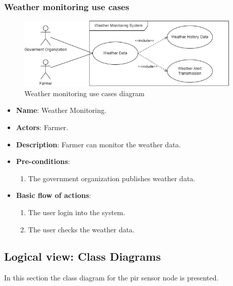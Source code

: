 \subsubsection*{Weather monitoring use cases}
\begin{figure}[H]
    \centering
    \includegraphics[width=0.95\textwidth]{./images/6/weather_uses.png}
    \caption{Weather monitoring use cases diagram}
\end{figure}
\begin{itemize}
    \item \textbf{Name}: Weather Monitoring.
    \item \textbf{Actors}: Farmer.
    \item \textbf{Description}: Farmer can monitor the weather data.
    \item \textbf{Pre-conditions}:
        \begin{enumerate}
            \item The government organization publishes weather data.
        \end{enumerate}
    \item \textbf{Basic flow of actions}:
        \begin{enumerate}
            \item The user login into the system.
            \item The user checks the weather data.
        \end{enumerate}
\end{itemize}

\clearpage
\subsection{Logical view: Class Diagrams}

In this section the class diagram for the \acrshort{pir} sensor node is presented.

